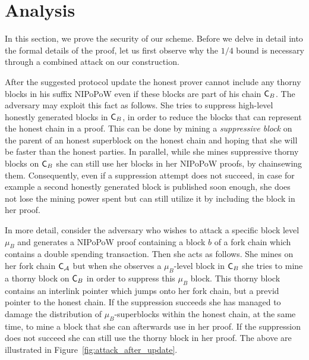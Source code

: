 \section{Analysis}\label{sec:analysis}
In this section, we prove the security of our scheme. Before we delve in detail into the formal
details of the proof, let us first observe why the $1/4$ bound is necessary through a combined attack
on our construction.

After the suggested protocol update the honest prover cannot include any thorny blocks in his suffix NIPoPoW even if these blocks are part of his chain $\mathsf{C}_B$. The adversary may exploit this fact as follows. She tries to suppress high-level honestly generated blocks in $\mathsf{C}_B$, in order to reduce the blocks that can represent the honest chain in a proof. This can be done by mining a \emph{suppressive block} on the parent of an honest superblock on the honest chain and hoping that she will be faster than the honest parties. In parallel, while she mines suppressive thorny blocks on $\mathsf{C}_B$ she can still use her blocks in her NIPoPoW proofs, by chainsewing them. Consequently, even if a suppression attempt does not succeed, in case for example a second honestly generated block is published soon enough, she does not lose the mining power spent but can still utilize it by including the block in her proof.

In more detail, consider the adversary who wishes to attack a specific block level $\mu_B$ and generates a NIPoPoW proof containing a block $b$ of a fork chain which contains a double spending transaction. Then she acts as follows. She mines on her fork chain $\mathsf{C}_\mathcal{A}$ but when she observes a $\mu_B$-level block in $\mathsf{C}_B$ she tries to mine a thorny block on $\mathsf{C}_B$ in order to suppress this $\mu_B$ block. This thorny block contains an interlink pointer which jumps onto her fork chain, but a previd pointer to the honest chain. If the suppression succeeds she has managed to damage the distribution of $\mu_B$-superblocks within the honest chain, at the same time, to mine a block that she can afterwards use in her proof. If the suppression does not succeed she can still use the thorny block in her proof. The above are illustrated in Figure~\ref{fig:attack_after_update}.

